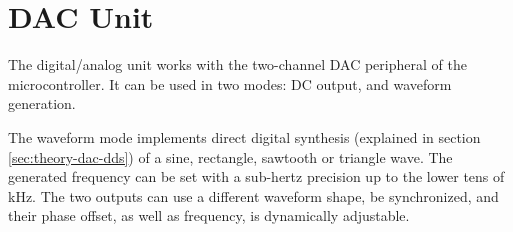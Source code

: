 \section{DAC Unit}

The digital/analog unit works with the two-channel DAC peripheral of the microcontroller. It can be used in two modes: DC output, and waveform generation.

The waveform mode implements direct digital synthesis (explained in section \ref{sec:theory-dac-dds}) of a sine, rectangle, sawtooth or triangle wave. The generated frequency can be set with a sub-hertz precision up to the lower tens of kHz. The two outputs can use a different waveform shape, be synchronized, and their phase offset, as well as frequency, is dynamically adjustable.
